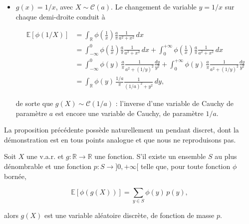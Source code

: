 \begin{exemple}
\begin{itemize}
On reconnaît, une nouvelle fois, la densité déjà calculée pour la partie fractionnaire d'une exponentielle.

\item $g(x) = 1/x$, avec $X \sim \mathcal{C}(a)$. Le changement de variable $y = 1/x$ sur chaque demi-droite conduit à

\begin{align*}
\mathbb{E}[\phi(1/X)] &= \int_{\mathbb{R}} \phi\!\left(\tfrac{1}{x}\right) \frac{a}{\pi} \frac{1}{a^2 + x^2}\, dx \\
&= \int_{-\infty}^0 \phi\!\left(\tfrac{1}{x}\right) \frac{a}{\pi} \frac{1}{a^2 + x^2}\, dx + \int_0^{+\infty} \phi\!\left(\tfrac{1}{x}\right) \frac{a}{\pi} \frac{1}{a^2 + x^2}\, dx \\
&= \int_{-\infty}^0 \phi(y)\, \frac{a}{\pi} \frac{1}{a^2 + (1/y)^2} \frac{dy}{y^2} + \int_0^{+\infty} \phi(y)\, \frac{a}{\pi} \frac{1}{a^2 + (1/y)^2} \frac{dy}{y^2} \\
&= \int_{\mathbb{R}} \phi(y)\, \frac{1/a}{\pi} \frac{1}{(1/a)^2 + y^2}\, dy,
\end{align*}

de sorte que $g(X) \sim \mathcal{C}(1/a)$ : l'inverse d'une variable de Cauchy de paramètre $a$ est encore une variable de Cauchy, de paramètre $1/a$.
\end{itemize}
\end{exemple}

La proposition précédente possède naturellement un pendant discret, dont la démonstration est en tous points analogue et que nous ne reproduisons pas.

\medskip

\begin{mdframed}
\begin{proposition}
Soit $X$ une v.a.r. et $g : \mathbb{R} \to \mathbb{R}$ une fonction. S'il existe un ensemble $S$ au plus dénombrable et une fonction $p : S \to ]0, +\infty[$ telle que, pour toute fonction $\phi$ bornée,

$$
\mathbb{E}[\phi(g(X))] = \sum_{y \in S} \phi(y)\, p(y),
$$

alors $g(X)$ est une variable aléatoire discrète, de fonction de masse $p$.
\end{proposition}
\end{mdframed}

